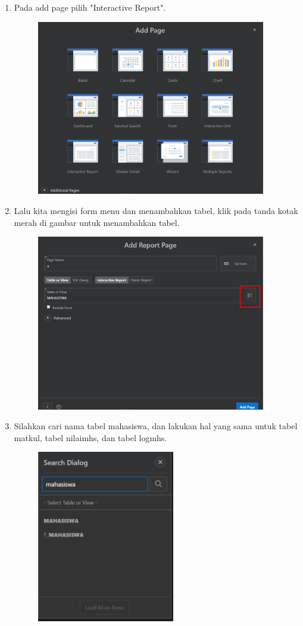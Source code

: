 \documentclass[12pt, times new roman]{article}
\begin{document}
\begin{enumerate}
\begin{figure}[!htbp]
\end{figure}
\item Pada add page pilih "Interactive Report".
\begin{figure}[!htbp]
	\centering
	\includegraphics[width=10cm]{figures/13.png}
\end{figure}
\item Lalu kita mengisi form menu dan menambahkan tabel, klik pada tanda kotak merah di gambar untuk menambahkan tabel.
\begin{figure}[!htbp]
	\centering
	\includegraphics[width=10cm]{figures/14.png}
\end{figure}
\item Silahkan cari nama tabel mahasiswa, dan lakukan hal yang sama untuk tabel matkul, tabel nilaimhs, dan tabel logmhs.
\begin{figure}[!htbp]
	\centering
	\includegraphics[width=6cm]{figures/15.png}

\end{figure}
\end{enumerate}
\end{document}

